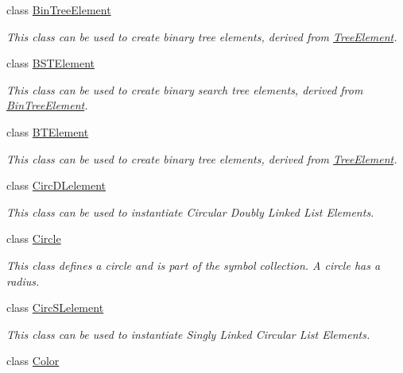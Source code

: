 \begin{DoxyCompactItemize}
class \hyperlink{classbridges_1_1datastructure_1_1_bin_tree_element}{Bin\+Tree\+Element}
\begin{DoxyCompactList}\small\item\em This class can be used to create binary tree elements, derived from \hyperlink{classbridges_1_1datastructure_1_1_tree_element}{Tree\+Element}. \end{DoxyCompactList}\item 
class \hyperlink{classbridges_1_1datastructure_1_1_b_s_t_element}{B\+S\+T\+Element}
\begin{DoxyCompactList}\small\item\em This class can be used to create binary search tree elements, derived from \hyperlink{classbridges_1_1datastructure_1_1_bin_tree_element}{Bin\+Tree\+Element}. \end{DoxyCompactList}\item 
class \hyperlink{classbridges_1_1datastructure_1_1_b_t_element}{B\+T\+Element}
\begin{DoxyCompactList}\small\item\em This class can be used to create binary tree elements, derived from \hyperlink{classbridges_1_1datastructure_1_1_tree_element}{Tree\+Element}. \end{DoxyCompactList}\item 
class \hyperlink{classbridges_1_1datastructure_1_1_circ_d_lelement}{Circ\+D\+Lelement}
\begin{DoxyCompactList}\small\item\em This class can be used to instantiate Circular Doubly Linked List Elements. \end{DoxyCompactList}\item 
class \hyperlink{classbridges_1_1datastructure_1_1_circle}{Circle}
\begin{DoxyCompactList}\small\item\em This class defines a circle and is part of the symbol collection. A circle has a radius. \end{DoxyCompactList}\item 
class \hyperlink{classbridges_1_1datastructure_1_1_circ_s_lelement}{Circ\+S\+Lelement}
\begin{DoxyCompactList}\small\item\em This class can be used to instantiate Singly Linked Circular List Elements. \end{DoxyCompactList}\item 
class \hyperlink{classbridges_1_1datastructure_1_1_color}{Color}

\end{DoxyCompactItemize}
